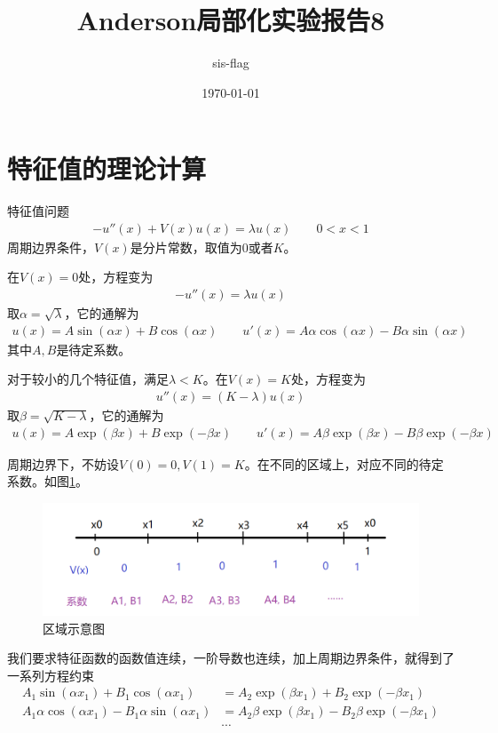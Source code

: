 \documentclass[12pt,a4paper]{article}
\title{Anderson局部化实验报告8}
\author{sis-flag}
\date{\today}
\begin{document}
\maketitle

\section*{特征值的理论计算}

特征值问题
\begin{align*}
- u''(x) + V(x) u(x) = \lambda u(x) \qquad 0 < x < 1
\end{align*}
周期边界条件，$V(x)$是分片常数，取值为$0$或者$K$。

在$V(x)=0$处，方程变为
\begin{align*}
- u''(x) = \lambda u(x)
\end{align*}
取$\alpha = \sqrt{\lambda}$，它的通解为
\begin{align*}
u(x) = A \sin(\alpha x) + B \cos(\alpha x) \qquad u'(x) = A \alpha \cos(\alpha x) - B \alpha \sin(\alpha x)
\end{align*}
其中$A,B$是待定系数。

对于较小的几个特征值，满足$\lambda < K$。在$V(x)=K$处，方程变为
\begin{align*}
u''(x) = (K - \lambda) u(x)
\end{align*}
取$\beta = \sqrt{K - \lambda}$，它的通解为
\begin{align*}
u(x) = A \exp(\beta x) + B \exp(-\beta x) \qquad u'(x) = A \beta \exp(\beta x) - B \beta \exp(-\beta x)
\end{align*}

周期边界下，不妨设$V(0)=0, V(1)=K$。在不同的区域上，对应不同的待定系数。如图\ref{f0}。
\begin{figure}[h]
\centering
\includegraphics[width=0.7\linewidth]{0}
\caption{区域示意图}
\label{f0}
\end{figure}

我们要求特征函数的函数值连续，一阶导数也连续，加上周期边界条件，就得到了一系列方程约束
\begin{align*}
A_1 \sin(\alpha x_1) + B_1 \cos(\alpha x_1) & = A_2 \exp(\beta x_1) + B_2 \exp(-\beta x_1) \\
A_1 \alpha \cos(\alpha x_1) - B_1 \alpha \sin(\alpha x_1) & = A_2 \beta \exp(\beta x_1) - B_2 \beta \exp(-\beta x_1) \\
& \cdots
\end{align*}
\end{document}
